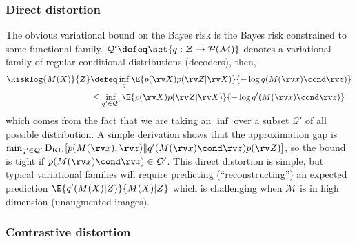 \documentclass[final]{article}
\begin{document}
\subsubsection{Direct distortion}
\label{appx:direct_dist}

The obvious variational bound on the Bayes risk is the Bayes risk constrained to some functional family. 
$\mathcal{Q}' \defeq \set{q : \mathcal{Z} \to  \mathcal{P}(\mathcal{M})}$ denotes a variational family of regular conditional distributions (decoders), then, 
\begin{align}\label{eq:direct_distortion_bound}
\Risklog{M(X)}{Z} &\defeq \inf_{q} \E{p(\rv X)p(\rv Z |\rv X)} {- \log q(M(\rv x) \cond \rv z)}  \\
&\leq \inf_{q' \in \mathcal{Q}'} \E{p(\rv X)p(\rv Z |\rv X)} {- \log q'(M(\rv x) \cond \rv z)}
\end{align}
which comes from the fact that we are taking an $\inf$ over a subset $\mathcal{Q}'$ of all possible distribution.
A simple derivation shows that the approximation gap is $\min_{q' \in \mathcal{Q}'} \operatorname{D}_{\text{KL}}\left[p(M(\rv x),\rv z)  \|
 q'(M(\rv x) \cond \rv z)p(\rv Z) 
\right]$, so the bound is tight if $p(M(\rv x) \cond \rv z) \in \mathcal{Q}'$.
This direct distortion is simple, but typical variational families will require predicting (``reconstructing'') an expected prediction $\E{q'(M(X)|Z)}{M(X)|Z}$ which is challenging when  $\mathcal{M}$ is in high dimension (\eg unaugmented images).


\subsubsection{Contrastive distortion}
\label{appx:contrastive_dist}
\end{document}

